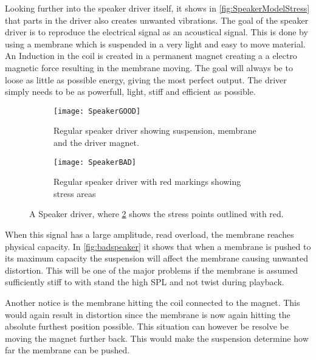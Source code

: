 Looking further into the speaker driver itself, it shows in \autoref{fig:SpeakerModelStress} that parts in the driver also creates unwanted vibrations. The goal of the speaker driver is to reproduce the electrical signal as an acoustical signal. This is done by using a membrane which is suspended in a very light and easy to move material. An Induction in the coil is created in a permanent magnet creating a a electro magnetic force resulting in the membrane moving. The goal will always be to loose as little as possible energy, giving the most perfect output. The driver simply needs to be as powerfull, light, stiff and efficient as possible.

\begin{figure}[H]
\centering
\begin{subfigure}[t]{0.47\textwidth}
\texttt{[image: SpeakerGOOD]}
	\caption{Regular speaker driver showing suspension, membrane and the driver magnet.}
	\label{fig:regularspeaker}
\end{subfigure}
\hspace{6mm} 
\begin{subfigure}[t]{0.47\textwidth}
\texttt{[image: SpeakerBAD]}
	\caption{Regular speaker driver with red markings showing stress areas}
	\label{fig:badspeaker}
\end{subfigure}
\caption{A Speaker driver, where \ref{fig:badspeaker} shows the stress points outlined with red.}
\label{fig:SpeakerModelStress}
\end{figure}

When this signal has a large amplitude, read overload, the membrane reaches physical capacity. In \autoref{fig:badspeaker} it shows that when a membrane is pushed to its maximum capacity the suspension will affect the membrane causing unwanted distortion. This will be one of the major problems if the membrane is assumed sufficiently stiff to with stand the high \gls{SPL} and not twist during playback. 

Another notice is the membrane hitting the coil connected to the magnet. This would again result in distortion since the membrane is now again hitting the absolute furthest position possible. This situation can however be resolve be moving the magnet further back. This would make the suspension determine how far the membrane can be pushed.

% 

